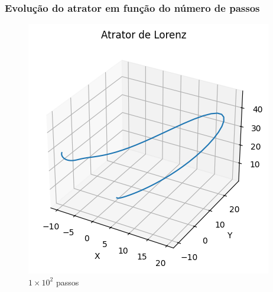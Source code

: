 
\begin{frame}
    \frametitle{Evolução do atrator em função do número de passos}
    \begin{figure}[htbp]
        \centering
        \begin{minipage}{0.32\textwidth}
            \centering
            \includegraphics[width=\linewidth]{01_docs/00_Relatorio/img/attrator100.png}
            \vspace{0.5em} %
            {\scriptsize $1 \times 10^2$ passos}
        \end{minipage}\hfill
        \begin{minipage}{0.32\textwidth}
            \centering

\end{minipage}
\end{figure}
\end{frame}
